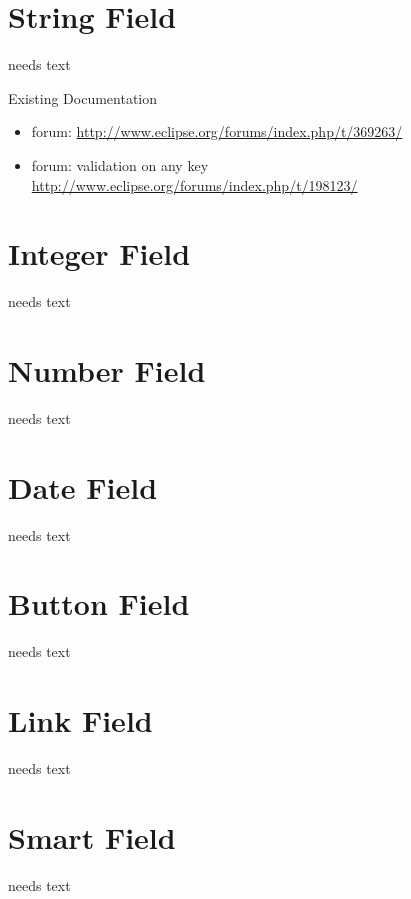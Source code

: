 \documentclass[a4paper,10pt,twoside]{book}
\begin{document}
\section{String Field}
needs text

\noindent Existing Documentation
\begin{itemize}
  \item forum: \url{http://www.eclipse.org/forums/index.php/t/369263/}
  \item forum: validation on any key \url{http://www.eclipse.org/forums/index.php/t/198123/}
\end{itemize}

\section{Integer Field}
needs text
	
\section{Number Field}
needs text
	
\section{Date Field}
needs text

\section{Button Field}
needs text

\section{Link Field}
needs text

\section{Smart Field}
needs text
\end{document}
